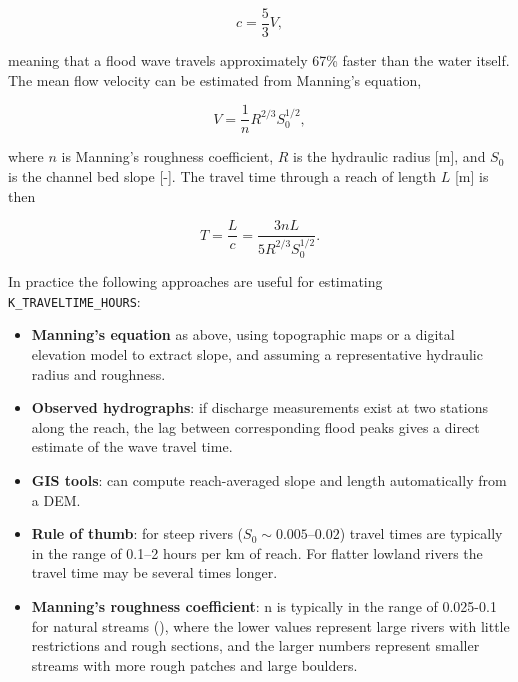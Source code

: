 \documentclass[a4paper, 12pt]{report}
\begin{document}
	\begin{equation}
		c = \frac{5}{3} V,
	\end{equation}
	
	meaning that a flood wave travels approximately 67\% faster than the water itself.
	The mean flow velocity can be estimated from Manning's equation,
	
	\begin{equation}
		V = \frac{1}{n} R^{2/3} S_0^{1/2},
	\end{equation}
	
	where $n$ is Manning's roughness coefficient, $R$ is the hydraulic radius [m], and
	$S_0$ is the channel bed slope [-]. The travel time through a reach of length $L$ [m]
	is then
	
	\begin{equation}
		T = \frac{L}{c} = \frac{3nL}{5 R^{2/3} S_0^{1/2}}.
	\end{equation}
	
	\noindent In practice the following approaches are useful for estimating
	\texttt{K\_TRAVELTIME\_HOURS}:
	
	\begin{itemize}
		\item \textbf{Manning's equation} as above, using topographic maps or a digital
		elevation model to extract slope, and assuming a representative hydraulic
		radius and roughness.
		
		\item \textbf{Observed hydrographs}: if discharge measurements exist at two
		stations along the reach, the lag between corresponding flood peaks gives a
		direct estimate of the wave travel time.
		
		\item \textbf{GIS tools}: can compute reach-averaged slope and length automatically from a DEM.
		
		\item \textbf{Rule of thumb}: for steep rivers ($S_0 \sim 0.005$--$0.02$)
		travel times are typically in the range of 0.1--2 hours per km of reach.
		For flatter lowland rivers the travel time may be several times longer.

        \item \textbf{Manning's roughness coefficient}: n is typically in the range of 0.025-0.1 for natural streams (\cite{JobsonFroelich88}), where the lower values represent large rivers with little restrictions and rough sections, and the larger numbers represent smaller streams with more rough patches and large boulders.  
            
	\end{itemize}
	
\end{document}
